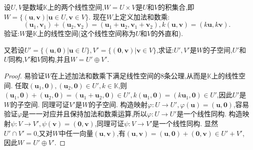 \documentclass[../../main.tex]{subfiles}%
\begin{document}
\begin{example}
设\(U,V\)是数域\(\mathbb{K}\)上的两个线性空间,\(W = U\times V\)是\(U\)和\(V\)的积集合,即\(W=\{(\boldsymbol{u},\boldsymbol{v})|\boldsymbol{u}\in U,\boldsymbol{v}\in V\}\). 现在\(W\)上定义加法和数乘:
\[
(\boldsymbol{u}_1,\boldsymbol{v}_1)+(\boldsymbol{u}_2,\boldsymbol{v}_2)=(\boldsymbol{u}_1+\boldsymbol{u}_2,\boldsymbol{v}_1+\boldsymbol{v}_2),k(\boldsymbol{u},\boldsymbol{v})=(k\boldsymbol{u},k\boldsymbol{v}).
\]
验证:\(W\)是\(\mathbb{K}\)上的线性空间(这个线性空间称为\(U\)和\(V\)的外直和).

又若设\(U'=\{(\boldsymbol{u},\boldsymbol{0})|\boldsymbol{u}\in U\},V'=\{(\boldsymbol{0},\boldsymbol{v})|\boldsymbol{v}\in V\}\),求证:\(U',V'\)是\(W\)的子空间,\(U'\)和\(U\)同构,\(V'\)和\(V\)同构,并且\(W = U'\oplus V'\).
\end{example}
\begin{proof}

易验证\(W\)在上述加法和数乘下满足线性空间的8条公理,从而是\(\mathbb{K}\)上的线性空间. 任取\((\boldsymbol{u}_1,\boldsymbol{0}),(\boldsymbol{u}_2,\boldsymbol{0})\in U',k\in\mathbb{K}\),则\((\boldsymbol{u}_1,\boldsymbol{0})+(\boldsymbol{u}_2,\boldsymbol{0})=(\boldsymbol{u}_1+\boldsymbol{u}_2,\boldsymbol{0})\in U',k(\boldsymbol{u}_1,\boldsymbol{0})=(k\boldsymbol{u}_1,\boldsymbol{0})\in U'\),因此\(U'\)是\(W\)的子空间. 同理可证\(V'\)是\(W\)的子空间. 构造映射\(\varphi:U\to U',\varphi(\boldsymbol{u})=(\boldsymbol{u},\boldsymbol{0})\),容易验证\(\varphi\)是一一对应并且保持加法和数乘运算,所以\(\varphi:U\to U'\)是一个线性同构. 构造映射\(\psi:V\to V',\psi(\boldsymbol{v})=(\boldsymbol{0},\boldsymbol{v})\),同理可证\(\psi:V\to V'\)是一个线性同构. 显然\(U'\cap V' = 0\),又对\(W\)中任一向量\((\boldsymbol{u},\boldsymbol{v})\),有\((\boldsymbol{u},\boldsymbol{v})=(\boldsymbol{u},\boldsymbol{0})+(\boldsymbol{0},\boldsymbol{v})\in U'+V'\),因此\(W = U'\oplus V'\). 


\end{proof}
\end{document}
